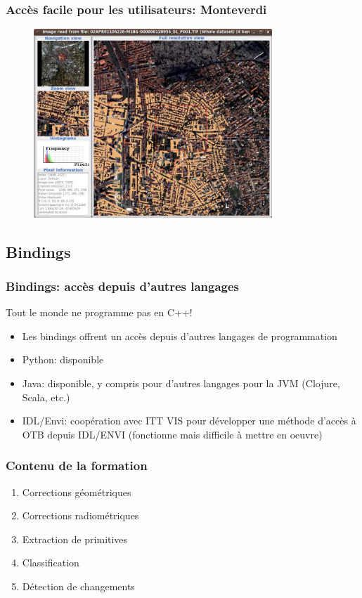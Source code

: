 \documentclass[compress]{beamer}
\begin{document}
\begin{frame}
\frametitle{Accès facile pour les utilisateurs: Monteverdi}
\begin{figure}[]
  \includegraphics[width=0.8\textwidth]{monteverdi2.jpg}
\end{figure}
\end{frame}

\subsection{Bindings}
\begin{frame}
\frametitle{Bindings: accès depuis d'autres langages}
\begin{block}{Tout le monde ne programme pas en C++!}
\scriptsize
\begin{itemize}
\item Les bindings offrent un accès depuis d'autres langages de programmation
\item \alert{Python}: disponible
\item \alert{Java}: disponible, y compris pour d'autres langages pour
  la JVM (Clojure, Scala, etc.)
\item \alert{IDL/Envi}: coopération avec ITT VIS pour développer une
  méthode d'accès à OTB depuis IDL/ENVI (fonctionne mais difficile à
  mettre en oeuvre)
\end{itemize}
\end{block}
\end{frame}


\begin{frame}
  \frametitle{Contenu de la formation}
  \begin{enumerate}
  \item Corrections géométriques
  \item Corrections radiométriques
  \item Extraction de primitives
  \item Classification
  \item Détection de changements
  \end{enumerate}
\end{frame}
\end{document}
